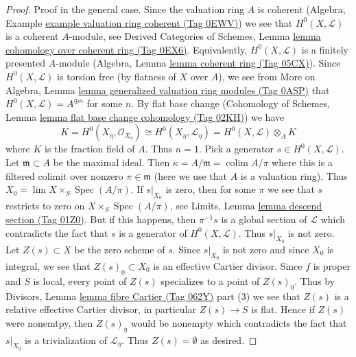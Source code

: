 \documentclass{amsart}
\theoremstyle{plain}
\theoremstyle{definition}
\theoremstyle{remark}
\numberwithin{equation}{subsection}
\def\lim{\mathop{\mathrm{lim}}\nolimits}
\def\colim{\mathop{\mathrm{colim}}\nolimits}
\def\Spec{\mathop{\mathrm{Spec}}}
\begin{document}
\begin{proof}
\medskip\noindent
Proof in the general case. Since the valuation ring $A$ is
coherent (Algebra, Example \href{https://stacks.math.columbia.edu/tag/0EWV}{example valuation ring coherent (Tag 0EWV)})
we see that $H^0(X, \mathcal{L})$ is a coherent $A$-module, see
Derived Categories of Schemes, Lemma
\href{https://stacks.math.columbia.edu/tag/0EX6}{lemma cohomology over coherent ring (Tag 0EX6)}.
Equivalently, $H^0(X, \mathcal{L})$ is a finitely presented
$A$-module (Algebra, Lemma \href{https://stacks.math.columbia.edu/tag/05CX}{lemma coherent ring (Tag 05CX)}).
Since $H^0(X, \mathcal{L})$ is torsion free (by flatness of $X$ over $A$),
we see from More on Algebra, Lemma
\href{https://stacks.math.columbia.edu/tag/0ASP}{lemma generalized valuation ring modules (Tag 0ASP)}
that $H^0(X, \mathcal{L}) = A^{\oplus n}$ for some $n$.
By flat base change (Cohomology of Schemes, Lemma
\href{https://stacks.math.columbia.edu/tag/02KH}{lemma flat base change cohomology (Tag 02KH)})
we have
$$
K = H^0(X_\eta, \mathcal{O}_{X_\eta}) \cong
H^0(X_\eta, \mathcal{L}_\eta) =
H^0(X, \mathcal{L}) \otimes_A K
$$
where $K$ is the fraction field of $A$. Thus $n = 1$.
Pick a generator $s \in H^0(X, \mathcal{L})$.
Let $\mathfrak m \subset A$ be the maximal ideal.
Then $\kappa = A/\mathfrak m = \colim A/\pi$ where
this is a filtered colimit over nonzero $\pi \in \mathfrak m$
(here we use that $A$ is a valuation ring).
Thus $X_0 = \lim X \times_S \Spec(A/\pi)$.
If $s|_{X_0}$ is zero, then for some $\pi$
we see that $s$ restricts to zero on $X \times_S \Spec(A/\pi)$, see
Limits, Lemma \href{https://stacks.math.columbia.edu/tag/01Z0}{lemma descend section (Tag 01Z0)}.
But if this happens, then $\pi^{-1} s$ is
a global section of $\mathcal{L}$ which contradicts
the fact that $s$ is a generator of $H^0(X, \mathcal{L})$.
Thus $s|_{X_0}$ is not zero. Let $Z(s) \subset X$ be the zero scheme of $s$.
Since $s|_{X_0}$ is not zero and since $X_0$ is integral,
we see that $Z(s)_0 \subset X_0$ is an effective Cartier divisor.
Since $f$ is proper and $S$ is local, every point of $Z(s)$
specializes to a point of $Z(s)_0$. Thus by
Divisors, Lemma \href{https://stacks.math.columbia.edu/tag/062Y}{lemma fibre Cartier (Tag 062Y)} part (3)
we see that $Z(s)$ is a relative effective Cartier divisor,
in particular $Z(s) \to S$ is flat.
Hence if $Z(s)$ were nonemtpy, then $Z(s)_\eta$ would be nonempty
which contradicts the fact that $s|_{X_\eta}$ is a trivialization
of $\mathcal{L}_\eta$. Thus $Z(s) = \emptyset$ as desired.
\end{proof}
\end{document}
